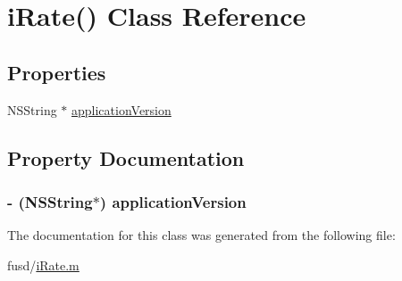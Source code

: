 \hypertarget{interfacei_rate_07_08}{
\section{i\-Rate() \-Class \-Reference}
\label{interfacei_rate_07_08}
}
\subsection*{\-Properties}
\begin{DoxyCompactItemize}
\item 
\-N\-S\-String $\ast$ \hyperlink{interfacei_rate_07_08_ab3ddb182ae553e22cc02589cd3549b4b}{application\-Version}
\end{DoxyCompactItemize}


\subsection{\-Property \-Documentation}
\hypertarget{interfacei_rate_07_08_ab3ddb182ae553e22cc02589cd3549b4b}{
\subsubsection[{application\-Version}]{\setlength{\rightskip}{0pt plus 5cm}-\/ (\-N\-S\-String$\ast$) application\-Version}}
\label{interfacei_rate_07_08_ab3ddb182ae553e22cc02589cd3549b4b}


\-The documentation for this class was generated from the following file\-:\begin{DoxyCompactItemize}
\item 
fusd/\hyperlink{i_rate_8m}{i\-Rate.\-m}\end{DoxyCompactItemize}

